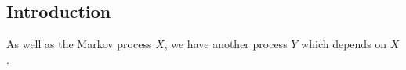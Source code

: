 
\subsection{Introduction}

As well as the Markov process \(X\), we have another process \(Y\) which depends on \(X\).


